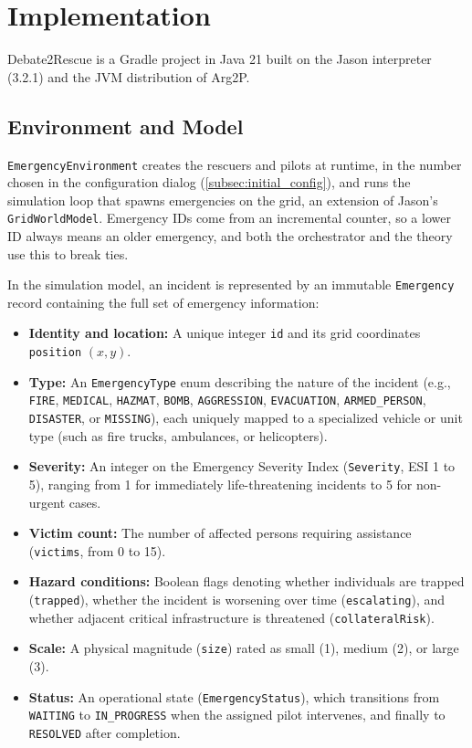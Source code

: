 \section{Implementation}\label{sec:implementation}

Debate2Rescue is a Gradle project in Java 21 built on the Jason interpreter (3.2.1) and the JVM distribution of Arg2P.

\subsection{Environment and Model}\label{subsec:impl_environment}

\texttt{EmergencyEnvironment} creates the rescuers and pilots at runtime, in the number chosen in the configuration dialog (\cref{subsec:initial_config}), and runs the simulation loop that spawns emergencies on the grid, an extension of Jason's \texttt{GridWorldModel}.
Emergency IDs come from an incremental counter, so a lower ID always means an older emergency, and both the orchestrator and the theory use this to break ties.

In the simulation model, an incident is represented by an immutable \texttt{Emergency} record containing the full set of emergency information:
\begin{itemize}
    \item \textbf{Identity and location:} A unique integer \texttt{id} and its grid coordinates \texttt{position} $(x, y)$.
    \item \textbf{Type:} An \texttt{EmergencyType} enum describing the nature of the incident (e.g., \texttt{FIRE}, \texttt{MEDICAL}, \texttt{HAZMAT}, \texttt{BOMB}, \texttt{AGGRESSION}, \texttt{EVACUATION}, \texttt{ARMED\_PERSON}, \texttt{DISASTER}, or \texttt{MISSING}), each uniquely mapped to a specialized vehicle or unit type (such as fire trucks, ambulances, or helicopters).
    \item \textbf{Severity:} An integer on the Emergency Severity Index (\texttt{Severity}, ESI 1 to 5), ranging from 1 for immediately life-threatening incidents to 5 for non-urgent cases.
    \item \textbf{Victim count:} The number of affected persons requiring assistance (\texttt{victims}, from 0 to 15).
    \item \textbf{Hazard conditions:} Boolean flags denoting whether individuals are trapped (\texttt{trapped}), whether the incident is worsening over time (\texttt{escalating}), and whether adjacent critical infrastructure is threatened (\texttt{collateralRisk}).
    \item \textbf{Scale:} A physical magnitude (\texttt{size}) rated as small (1), medium (2), or large (3).
    \item \textbf{Status:} An operational state (\texttt{EmergencyStatus}), which transitions from \texttt{WAITING} to \texttt{IN\_PROGRESS} when the assigned pilot intervenes, and finally to \texttt{RESOLVED} after completion.
\end{itemize}

